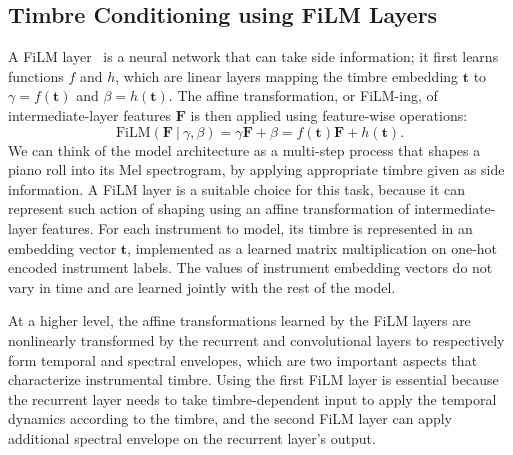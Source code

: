 \subsection{Timbre Conditioning using FiLM Layers}

A FiLM layer~\cite{perez2018film} is a neural network that can take side information; it first learns functions $f$ and $h$, which are linear layers mapping the timbre embedding $\mathbf{t}$ to $\gamma = f ( \mathbf{t} )$ and $\beta = h ( \mathbf{t} )$.
The affine transformation, or FiLM-ing, of intermediate-layer features $\mathbf{F}$ is then applied using feature-wise operations: 
\begin{equation}
\mathrm{FiLM}(\mathbf{F} ~|~ \gamma, \beta)
= \gamma \mathbf{F} + \beta
= f(\mathbf{t})\mathbf{F} + h(\mathbf{t}).
\end{equation}
We can think of the model architecture as a multi-step process that shapes a piano roll into its Mel spectrogram, by applying appropriate timbre given as side information.
A FiLM layer is a suitable choice for this task, because it can represent such action of shaping using an affine transformation of intermediate-layer features.
For each instrument to model, its timbre is represented in an embedding vector $\mathbf{t}$, implemented as a learned matrix multiplication on one-hot encoded instrument labels.
The values of instrument embedding vectors do not vary in time and are learned jointly with the rest of the model.

At a higher level, the affine transformations learned by the FiLM layers are nonlinearly transformed by the recurrent and convolutional layers to respectively form temporal and spectral envelopes, which are two important aspects that characterize instrumental timbre.
Using the first FiLM layer is essential because the recurrent layer needs to take timbre-dependent input to apply the temporal dynamics according to the timbre, and the second FiLM layer can apply additional spectral envelope on the recurrent layer's output.

